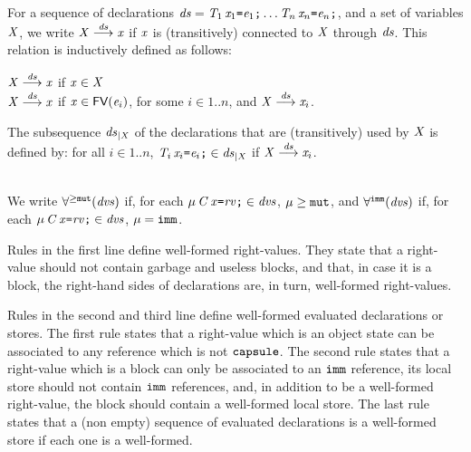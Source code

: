 {For a sequence of declarations $\mathit{ds}=\mathit{T}_1\,\mathit{x}_1\texttt{=}\mathit{e}_1\texttt{;}\ldots\mathit{T}_n\,\mathit{x}_n\texttt{=}\mathit{e}_n\texttt{;}$, and a set of variables $\mathit{X}$, we write $\mathit{X}\stackrel{\mathit{ds}}{\longrightarrow}\mathit{x}$ if $\mathit{x}$ is (transitively) connected to $\mathit{X}$ through $\mathit{ds}$. This relation  is inductively defined as follows:
\begin{center}
$\mathit{X}\stackrel{\mathit{ds}}{\longrightarrow}\mathit{x}$ if $\mathit{x}\in\mathit{X}$\\
$\mathit{X}\stackrel{\mathit{ds}}{\longrightarrow}\mathit{x}$ if $\mathit{x}\in\textsf{FV}(\mathit{e}_i)$, for some $i\in 1..n$, and $\mathit{X}\stackrel{\mathit{ds}}{\longrightarrow}\mathit{x}_i$.
\end{center}
The subsequence $\mathit{ds}_{|\mathit{X}}$ of the declarations that are (transitively) used by $\mathit{X}$ is defined by: for all $i\in 1..n$, $\mathit{T}_i\,\mathit{x}_i\texttt{=}\mathit{e}_i\texttt{;}\in\mathit{ds}_{|\mathit{X}}$ if  $\mathit{X}\stackrel{\mathit{ds}}{\longrightarrow}\mathit{x}_i$.
}
\\
We write $\forall^{\geq\texttt{mut}}(\mathit{dvs})$ if, for each $\mu\,\mathit{C}\,\mathit{x}\texttt{=}{\mathit{rv}}\texttt{;}\in\mathit{dvs}$, $\mu\geq\texttt{mut}$, and $\forall^{\texttt{imm}}(\mathit{dvs})$ if, for each $\mu\,\mathit{C}\,\mathit{x}\texttt{=}{\mathit{rv}}\texttt{;}\in\mathit{dvs}$, $\mu=\texttt{imm}$. 

Rules in the first line define well-formed right-values. 
They state that a right-value should not contain garbage and useless blocks, and that, in case it is a block, 
{the right-hand sides of declarations are, in turn, well-formed right-values.}

Rules in the second and third line define {well-formed}  evaluated declarations or stores. The first rule {states} that
a right-value which is an object state can be associated to any reference which is not $\texttt{capsule}$.
The second rule {states} that a right-value which is a block can only be associated to an $\texttt{imm}$ reference,
its local store should not contain $\texttt{imm}$ references, and, in addition to be a well-formed
right-value, the block should contain a well-formed local store.    
The last rule states that a (non empty) sequence of evaluated declarations is a well-formed store if each one is a well-formed. 

